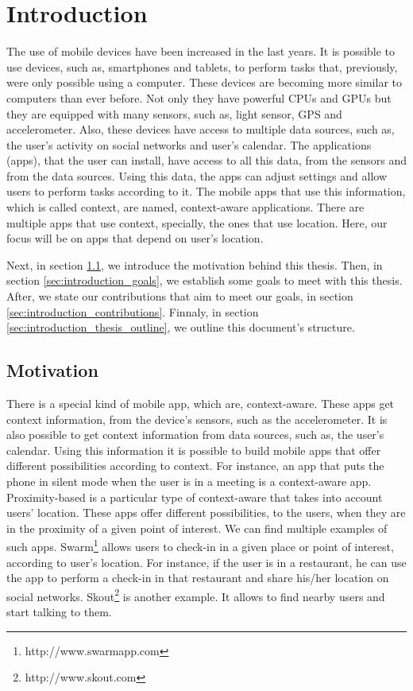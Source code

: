 
\chapter{Introduction}
\label{chapter:introduction}
The use of mobile devices have been increased in the last years.
It is possible to use devices, such as, smartphones and tablets, to perform tasks that, previously, were only possible using a computer.
These devices are becoming more similar to computers than ever before.
Not only they have powerful \glspl{CPU} and \glspl{GPU} but they are equipped with many sensors, such as, light sensor, \gls{GPS} and accelerometer.
Also, these devices have access to multiple data sources, such as,
the user's activity on social networks and user's calendar.
The applications (apps), that the user can install, have access to all this data, from the sensors and from the data sources.
Using this data, the apps can adjust settings and allow users to perform tasks according to it.
The mobile apps that use this information, which is called context, are named, context-aware applications.
There are multiple apps that use context, specially, the ones that use location.
Here, our focus will be on apps that depend on user's location.

Next, in section \ref{sec:introduction_motivation}, we introduce the motivation behind this thesis.
Then, in section \ref{sec:introduction_goals}, we establish some goals to meet with this thesis.
After, we state our contributions that aim to meet our goals, in section \ref{sec:introduction_contributions}.
Finnaly, in section \ref{sec:introduction_thesis_outline}, we outline this document's structure.

\section{Motivation}
\label{sec:introduction_motivation}
There is a special kind of mobile app, which are, context-aware.
These apps get context information, from the device's sensors, such as the accelerometer.
It is also possible to get context information from data sources, such as, the user's calendar.
Using this information it is possible to build mobile apps that offer different possibilities according to context.
For instance, an app that puts the phone in silent mode when the user is in a meeting is a context-aware app.
Proximity-based is a particular type of context-aware that takes into account users' location.
These apps offer different possibilities, to the users, when they are in the proximity of a given point of interest.
We can find multiple examples of such apps.
Swarm\footnote{http://www.swarmapp.com} allows users to check-in in a given place or point of interest, according to user's location.
For instance, if the user is in a restaurant, he can use the app to perform a check-in in that restaurant and share his/her location on social networks.
Skout\footnote{http://www.skout.com}
is another example. It allows to find nearby users and start talking to them.

